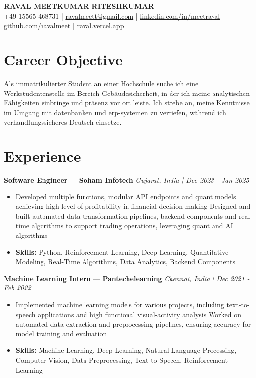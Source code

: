 \documentclass[a4paper,10pt]{article}
\begin{document}
\begin{center}
  {\Large\bfseries RAVAL MEETKUMAR RITESHKUMAR}\\[2pt]
  {\small +49 15565 468731 \;|\; \href{mailto:ravalmeett@gmail.com}{ravalmeett@gmail.com} \;|\; \href{https://www.linkedin.com/in/meetraval/}{linkedin.com/in/meetraval} \;|\; \href{https://github.com/ravalmeet}{github.com/ravalmeet} \;|\; \href{https://raval.vercel.app/}{raval.vercel.app}}
\end{center}
\vspace{-3pt}

\section*{Career Objective}
Als immatrikulierter Student an einer Hochschule suche ich eine Werkstudentenstelle im Bereich Gebäudesicherheit, in der ich meine analytischen Fähigkeiten einbringe und präsenz vor ort leiste. Ich strebe an, meine Kenntnisse im Umgang mit datenbanken und erp-systemen zu vertiefen, während ich verhandlungssicheres Deutsch einsetze.\par

\section*{Experience}
\textbf{Software Engineer} — \textbf{Soham Infotech} \hfill \textit{Gujarat, India \;|\; Dec 2023 - Jan 2025}\par
\vspace{1pt}
\begin{itemize}
  \item Developed multiple functions, modular API endpoints and quant models achieving high level of profitability in financial decision-making Designed and built automated data transformation pipelines, backend components and real-time algorithms to support trading operations, leveraging quant and AI algorithms
  \item \textbf{Skills:} Python, Reinforcement Learning, Deep Learning, Quantitative Modeling, Real-Time Algorithms, Data Analytics, Backend Components
\end{itemize}
\vspace{3pt}
\textbf{Machine Learning Intern} — \textbf{Pantechelearning} \hfill \textit{Chennai, India \;|\; Dec 2021 - Feb 2022}\par
\vspace{1pt}
\begin{itemize}
  \item Implemented machine learning models for various projects, including text-to-speech applications and high functional visual-activity analysis Worked on automated data extraction and preprocessing pipelines, ensuring accuracy for model training and evaluation
  \item \textbf{Skills:} Machine Learning, Deep Learning, Natural Language Processing, Computer Vision, Data Preprocessing, Text-to-Speech, Reinforcement Learning
\end{itemize}
\end{document}
